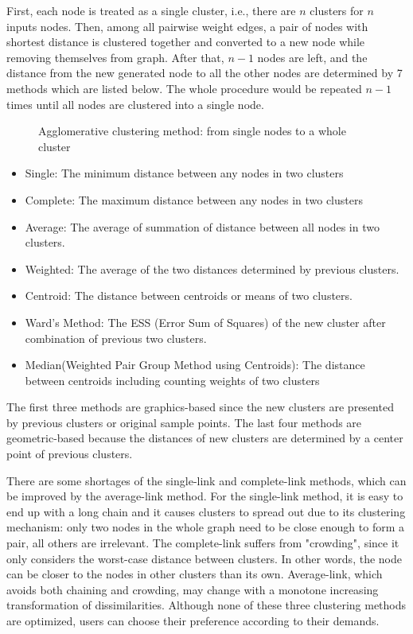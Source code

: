 \documentclass[journal]{vgtc}                %
\begin{document}
First, each node is treated as a single cluster, i.e., there are $n$ clusters for $n$ inputs nodes. Then, among all pairwise weight edges, a pair of nodes with shortest distance is clustered together and converted to a new node while removing themselves from graph. After that, $n-1$ nodes are left, and the distance from the new generated node to all the other nodes are determined by 7 methods \cite{fastercluster} which are listed below. The whole procedure would be repeated $n - 1$ times until all nodes are clustered into a single node. 

\begin{figure}[htbp]
  \centering
  
  \caption{Agglomerative clustering method: from single nodes to a whole cluster}
\end{figure}

\begin{itemize}
    \setlength\itemsep{0em}
    \item Single\cite{DBLP:conf/issnip/2013}: The minimum distance between any nodes in two clusters
    \item Complete\cite{DBLP:conf/mfcs/1997}: The maximum distance between any nodes in two clusters
    \item Average\cite{Cohen-addad:2019:HCO:3338848.3321386}: The average of summation of distance between all nodes in two clusters.
    \item Weighted\cite{mello1968application}: The average of the two distances determined by previous clusters.
    \item Centroid\cite{DBLP:journals/corr/Glover16}: The distance between centroids or means of two clusters.
    \item Ward's Method\cite{DBLP:journals/corr/abs-1111-6285}: The ESS (Error Sum of Squares) of the new cluster after combination of previous two clusters.
    \item Median(Weighted Pair Group Method using Centroids)\cite{Cohen-addad:2019:HCO:3338848.3321386}: The distance between centroids including counting weights of two clusters
\end{itemize}
The first three methods are graphics-based since the new clusters are presented by previous clusters or original sample points. The last four methods are geometric-based because the distances of new clusters are determined by a center point of previous clusters.

There are some shortages of the single-link and complete-link\cite{althaus2014greedy} methods, which can be improved by the average-link method. For the single-link method, it is easy to end up with a long chain and it causes clusters to spread out due to its clustering mechanism: only two nodes in the whole graph need to be close enough to form a pair, all others are irrelevant. The complete-link suffers from "crowding", since it only considers the worst-case distance between clusters. In other words, the node can be closer to the nodes in other clusters than its own. Average-link, which avoids both chaining and crowding, may change with a monotone increasing transformation of dissimilarities. Although none of these three clustering methods are optimized, users can choose their preference according to their demands.
\end{document}
